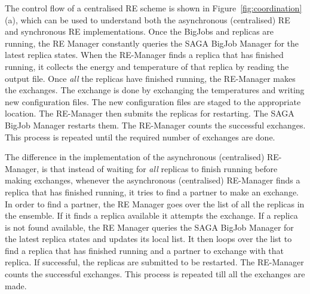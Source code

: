 \documentclass{rspublic}
\newcommand{\jhanote}[1]{ {\textcolor{red} { ***shantenu: #1 }}}
\newcommand{\alnote}[1]{ {\textcolor{blue} { ***andre: #1 }}}
\newcommand{\alnote}[1]{}
\newcommand{\jhanote}[1]{}
\begin{document}


The control flow of a centralised RE scheme is shown in
Figure~\ref{fig:coordination}(a), which can be used to understand both
the asynchronous (centralised) RE and synchronous RE implementations.
Once the BigJobs and replicas are running, the RE Manager constantly
queries the SAGA BigJob Manager for the latest replica states.  When
the RE-Manager finds a replica that has finished running, it collects
the energy and temperature of that replica by reading the output
file. Once \emph{all} the replicas have finished running, the
RE-Manager makes the exchanges. The exchange is done by exchanging the
temperatures and writing new configuration files. The new
configuration files are staged to the appropriate location. The
RE-Manager then submits the replicas for restarting. %
The SAGA BigJob Manager restarts them. The RE-Manager
counts the successful exchanges. This process is repeated until the
required number of exchanges are done.

The difference in the implementation of the asynchronous (centralised)
RE-Manager, is that instead of waiting for \emph{all} replicas to
finish running before making exchanges, whenever the asynchronous
(centralised) RE-Manager finds a replica that has finished running, it
tries to find a partner to make an exchange. In order to find a
partner, the RE Manager goes over the list of all the replicas in the
ensemble. If it finds a replica available it attempts the exchange. If
a replica is not found available, the RE Manager queries the SAGA
BigJob Manager for the latest replica states and updates its local
list. It then loops over the list to find a replica that has finished
running and a partner to exchange with that replica.  If successful,
the replicas are submitted to be
restarted. %
The RE-Manager counts the successful
exchanges. This process is repeated till all the exchanges are made.


\end{document}
